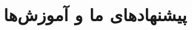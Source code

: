 \documentclass[a4paper]{report}
\begin{document}


\newpage
\tableofcontents

\chapter{ پیشنهادهای ما و آموزش‌ها}

\end{document}

